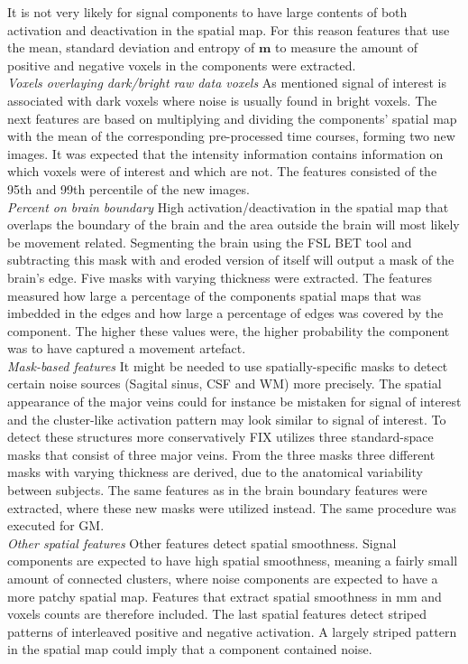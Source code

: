 It is not very likely for signal components to have large contents of both activation and deactivation in the spatial map. For this reason features that use the mean, standard deviation and entropy of $\mathbf{m}$ to measure the amount of positive and negative voxels in the components were extracted. \\
\textit{Voxels overlaying dark/bright raw data voxels}
As mentioned signal of interest is associated with dark voxels where noise is usually found in bright voxels. The next features are based on multiplying and dividing the components’ spatial map with the mean of the corresponding pre-processed time courses, forming two new images. It was expected that the intensity information contains information on which voxels were of interest and which are not. The features consisted of the 95th and 99th percentile of the new images. \\
\textit{Percent on brain boundary} High activation/deactivation in the spatial map that overlaps the boundary of the brain and the area outside the brain will most likely be movement related. Segmenting the brain using the FSL BET tool and subtracting this mask with and eroded version of itself will output a mask of the brain’s edge. Five masks with varying thickness were extracted. The features measured how large a percentage of the components spatial maps that was imbedded in the edges and how large a percentage of edges was covered by the component. The higher these values were, the higher probability the component was to have captured a movement artefact. \\
\textit{Mask-based features} It might be needed to use spatially-specific masks to detect certain noise sources (Sagital sinus, CSF and WM) more precisely. The spatial appearance of the major veins could for instance be mistaken for signal of interest and the cluster-like activation pattern may look similar to signal of interest. To detect these structures more conservatively FIX utilizes three standard-space masks that consist of three major veins. From the three masks three different masks with varying thickness are derived, due to the anatomical variability between subjects. The same features as in the brain boundary features were extracted, where these new masks were utilized instead. The same procedure was executed for GM. \\
\textit{Other spatial features} Other features detect spatial smoothness. Signal components are expected to have high spatial smoothness, meaning a fairly small amount of connected clusters, where noise components are expected to have a more patchy spatial map. Features that extract spatial smoothness in mm and voxels counts are therefore included. The last spatial features detect striped patterns of interleaved positive and negative activation. A largely striped pattern in the spatial map could imply that a component contained noise. \cite{Salimi-Khorshidi2014}




